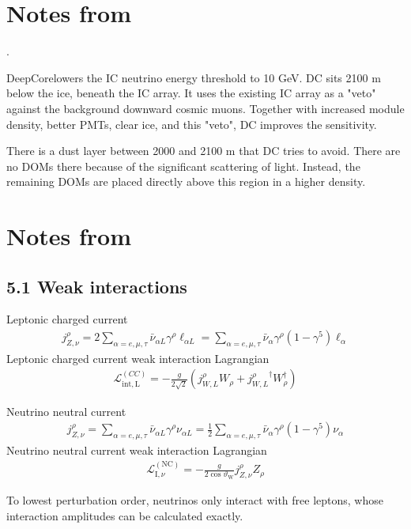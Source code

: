 \documentclass[twocolumn]{article}
\newcommand{\na}{\ensuremath{\nu_\alpha}}
\begin{document}
\section{Notes from~\cite{IC2012}}.

DeepCorelowers the IC neutrino energy threshold to 10 GeV.
DC sits 2100 m below the ice, beneath the IC array.
It uses the existing IC array as a "veto" against the background downward cosmic muons. Together with increased module density, better PMTs, clear ice, and this "veto", DC improves the sensitivity.

There is a dust layer between 2000 and 2100 m that DC tries to avoid. There are no DOMs there because of the significant scattering of light. Instead, the remaining DOMs are placed directly above this region in a higher density.

\section{Notes from~\cite{giunti}}
\subsection*{5.1 Weak interactions}
Leptonic charged current
\begin{align}
  j^\rho_{Z,\nu} = 2\sum_{\alpha = e,\mu,\tau} \bar{\nu}_{\alpha L} \gamma^\rho \ell_{\alpha L}
= \sum_{\alpha = e,\mu,\tau} \bar{\nu}_\alpha \gamma^\rho(1-\gamma^5)\ell_\alpha
\end{align}
Leptonic charged current weak interaction Lagrangian
\begin{align}
  \mathcal{L}^{(CC)}_{\mathrm{int,L}} = - \frac{g}{2\sqrt{2}}\left( j^\rho_{W,L}W_\rho + {j^\rho_{W,L}}^{\dagger} W^\dagger_\rho \right)
\end{align}

Neutrino neutral current
\begin{align}
  j^\rho_{Z,\nu} = \sum_{\alpha = e,\mu,\tau} \bar{\nu}_{\alpha L} \gamma^\rho \nu_{\alpha L}
= \frac{1}{2} \sum_{\alpha = e,\mu,\tau} \bar{\nu}_\alpha \gamma^\rho(1-\gamma^5)\na 
\end{align}
Neutrino neutral current weak interaction Lagrangian
\begin{align}
  \mathcal{L}_{\mathrm{I}, \nu}^{(\mathrm{NC})}=-\frac{g}{2 \cos \vartheta_{\mathrm{W}}} j_{Z, \nu}^{\rho} Z_{\rho}
\end{align}

To lowest perturbation order, neutrinos only interact with free leptons, whose interaction amplitudes can be calculated exactly.
\end{document}
